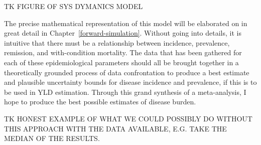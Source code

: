 TK FIGURE OF SYS DYMANICS MODEL

The precise mathematical representation of this model will be
elaborated on in great detail in
Chapter~\ref{forward-simulation}. Without going into details, it is 
intuitive that there must be a relationship between
incidence, prevalence, remission, and with-condition mortality. The
data that has been gathered for each of these epidemiological
parameters should all be brought together in a theoretically grounded
process of data confrontation to produce a best estimate and plausible
uncertainty bounds for disease incidence and prevalence, if this is to
be used in YLD estimation. Through this grand synthesis of a
meta-analysis, I hope to produce the best possible estimates of
disease burden.

TK HONEST EXAMPLE OF WHAT WE COULD POSSIBLY DO WITHOUT THIS APPROACH
WITH THE DATA AVAILABLE, E.G. TAKE THE MEDIAN OF THE RESULTS.



